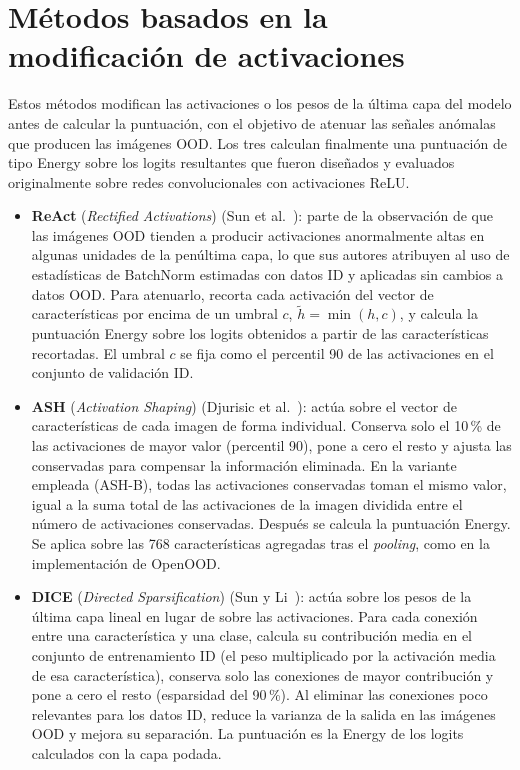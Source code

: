 \section{Métodos basados en la modificación de activaciones}\label{sec:metodos-activaciones}

Estos métodos modifican las activaciones o los pesos de la última capa del modelo antes de calcular la puntuación, con el objetivo de atenuar las señales anómalas que producen las imágenes OOD. Los tres calculan finalmente una puntuación de tipo Energy sobre los logits resultantes que fueron diseñados y evaluados originalmente sobre redes convolucionales con activaciones ReLU.

\begin{itemize}
  \item \textbf{ReAct} (\emph{Rectified Activations}) (Sun et al.~\cite{sun2021react}): parte de la observación de que las imágenes OOD tienden a producir activaciones anormalmente altas en algunas unidades de la penúltima capa, lo que sus autores atribuyen al uso de estadísticas de BatchNorm estimadas con datos ID y aplicadas sin cambios a datos OOD. Para atenuarlo, recorta cada activación del vector de características por encima de un umbral $c$, $\tilde{h} = \min(h, c)$, y calcula la puntuación Energy sobre los logits obtenidos a partir de las características recortadas. El umbral $c$ se fija como el percentil 90 de las activaciones en el conjunto de validación ID.
  \item \textbf{ASH} (\emph{Activation Shaping}) (Djurisic et al.~\cite{djurisic2023}): actúa sobre el vector de características de cada imagen de forma individual. Conserva solo el 10\,\% de las activaciones de mayor valor (percentil 90), pone a cero el resto y ajusta las conservadas para compensar la información eliminada. En la variante empleada (ASH-B), todas las activaciones conservadas toman el mismo valor, igual a la suma total de las activaciones de la imagen dividida entre el número de activaciones conservadas. Después se calcula la puntuación Energy. Se aplica sobre las 768 características agregadas tras el \emph{pooling}, como en la implementación de OpenOOD.
  \item \textbf{DICE} (\emph{Directed Sparsification}) (Sun y Li~\cite{sun2022dice}): actúa sobre los pesos de la última capa lineal en lugar de sobre las activaciones. Para cada conexión entre una característica y una clase, calcula su contribución media en el conjunto de entrenamiento ID (el peso multiplicado por la activación media de esa característica), conserva solo las conexiones de mayor contribución y pone a cero el resto (esparsidad del 90\,\%). Al eliminar las conexiones poco relevantes para los datos ID, reduce la varianza de la salida en las imágenes OOD y mejora su separación. La puntuación es la Energy de los logits calculados con la capa podada.
\end{itemize}

